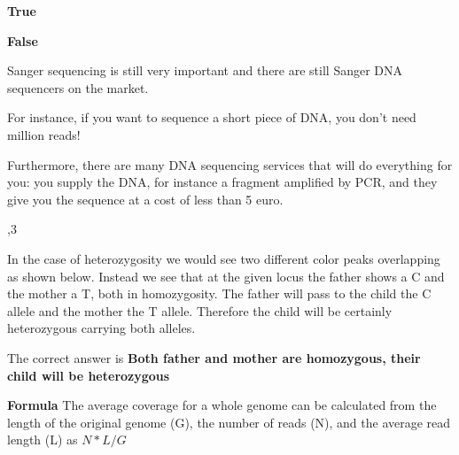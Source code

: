 \begin{Answer} [
   ref={ex14},
   number={14}
 ]

  \Question \textbf{True}

\end{Answer}

\begin{Answer} [
   ref={ex15},
   number={15}
 ]

  \Question \textbf{False}

Sanger sequencing is still very important and there are still Sanger DNA
sequencers on the market.

For instance, if you want to sequence a short piece of DNA, you don't need
million reads!

Furthermore, there are many DNA sequencing services that will do everything
for you: you supply the DNA, for instance a fragment amplified by PCR, and
they give you the sequence at a cost of less than 5 euro.

\end{Answer}

\begin{Answer} [
   ref={ex16},
   number={16}
 ]

  ,3

In the case of heterozygosity we would see two different color peaks
overlapping as shown below.
Instead we see that at the given locus the father shows a C and the mother
a T, both in homozygosity.
The father will pass to the child the C allele and the mother the T allele.
Therefore the child will be certainly heterozygous carrying both alleles.

The correct answer is \textbf{Both father and mother are homozygous,
their child will be heterozygous}

\end{Answer}

\begin{Answer} [
   ref={ex17},
   number={17}
 ]


\textbf{Formula} The average coverage for a whole genome can be calculated
from the length of the original genome (G), the number of reads (N), and the
average read length (L) as $N*L/G$

\end{Answer}

\begin{Answer} [
   ref={ex18},
   number={18}
 ]


\end{Answer}

